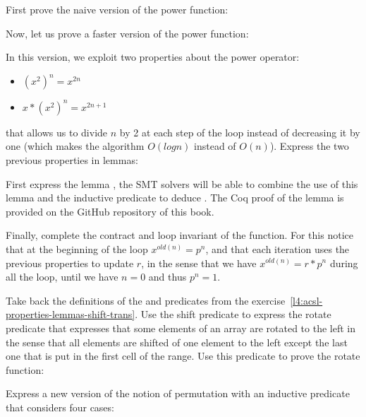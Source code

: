 First prove the naive version of the power function:




Now, let us prove a faster version of the power function:




In this version, we exploit two properties about the power operator:


\begin{itemize}
\item $(x^2)^n = x^{2n}$
\item $x * (x^2)^n = x^{2n+1}$
\end{itemize}


that allows us to divide $n$ by 2 at each step of the loop instead of decreasing
it by one (which makes the algorithm $O(log n)$ instead of $O(n)$). Express the
two previous properties in lemmas:




First express the lemma , the SMT solvers will be able
to combine the use of this lemma and the inductive predicate to deduce
. The Coq proof of the  lemma is
provided on the GitHub repository of this book.


Finally, complete the contract and loop invariant of the 
function. For this notice that at the beginning of the loop $x^{old(n)} = p^n$,
and that each iteration uses the previous properties to update $r$, in the sense
that we have $x^{old(n)} = r * p^n$ during all the loop, until we have $n = 0$ and
thus $p^n = 1$.




Take back the definitions of the  and 
predicates from the exercise~\ref{l4:acsl-properties-lemmas-shift-trans}. Use the
shift predicate to express the rotate predicate that expresses that some elements
of an array are rotated to the left in the sense that all elements are shifted of
one element to the left except the last one that is put in the first cell of the
range. Use this predicate to prove the rotate function:




Express a new version of the notion of permutation with an inductive predicate
that considers four cases:

